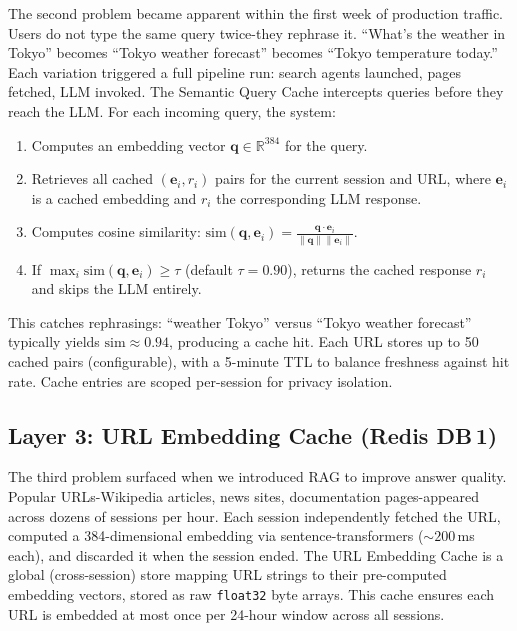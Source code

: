 \documentclass[conference]{IEEEtran}
\begin{document}
The second problem became apparent within the first week of production traffic. Users do not type the same query twice-they rephrase it. ``What's the weather in Tokyo'' becomes ``Tokyo weather forecast'' becomes ``Tokyo temperature today.'' Each variation triggered a full pipeline run: search agents launched, pages fetched, LLM invoked. The Semantic Query Cache intercepts queries before they reach the LLM. For each incoming query, the system:

\begin{enumerate}
\item Computes an embedding vector $\mathbf{q} \in \mathbb{R}^{384}$ for the query.
\item Retrieves all cached $(\mathbf{e}_i, r_i)$ pairs for the current session and URL, where $\mathbf{e}_i$ is a cached embedding and $r_i$ the corresponding LLM response.
\item Computes cosine similarity: $\text{sim}(\mathbf{q}, \mathbf{e}_i) = \frac{\mathbf{q} \cdot \mathbf{e}_i}{\|\mathbf{q}\| \|\mathbf{e}_i\|}$.
\item If $\max_i \text{sim}(\mathbf{q}, \mathbf{e}_i) \geq \tau$ (default $\tau{=}0.90$), returns the cached response $r_i$ and skips the LLM entirely.
\end{enumerate}

This catches rephrasings: ``weather Tokyo'' versus ``Tokyo weather forecast'' typically yields $\text{sim} \approx 0.94$, producing a cache hit. Each URL stores up to 50 cached pairs (configurable), with a 5-minute TTL to balance freshness against hit rate. Cache entries are scoped per-session for privacy isolation.

\subsection{Layer 3: URL Embedding Cache (Redis DB\,1)}

The third problem surfaced when we introduced RAG to improve answer quality. Popular URLs-Wikipedia articles, news sites, documentation pages-appeared across dozens of sessions per hour. Each session independently fetched the URL, computed a 384-dimensional embedding via sentence-transformers (${\sim}200$\,ms each), and discarded it when the session ended. The URL Embedding Cache is a global (cross-session) store mapping URL strings to their pre-computed embedding vectors, stored as raw \texttt{float32} byte arrays. This cache ensures each URL is embedded at most once per 24-hour window across all sessions.
\end{document}
